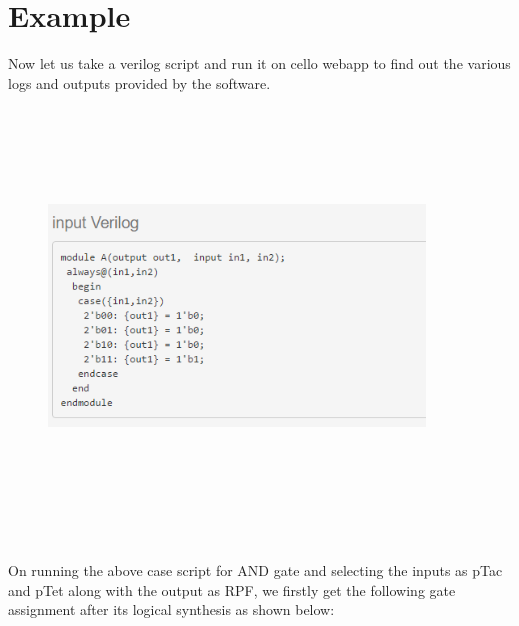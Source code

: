 \documentclass[11pt]{article}
\begin{document}
\section*{Example}
Now let us take a verilog script and run it on cello webapp to find out the various logs and outputs provided by the software.
\begin{figure}[ht!]
\centering
\includegraphics[width=10cm,height=11cm,keepaspectratio]{Screenshot_1.png}
\label{Case exmaple}
\end{figure}
\\[\baselineskip]    
On running the above case script for AND gate and selecting the inputs as pTac and pTet along with the output as RPF, we firstly get the following gate assignment after its logical synthesis as shown below:  
\end{document}
